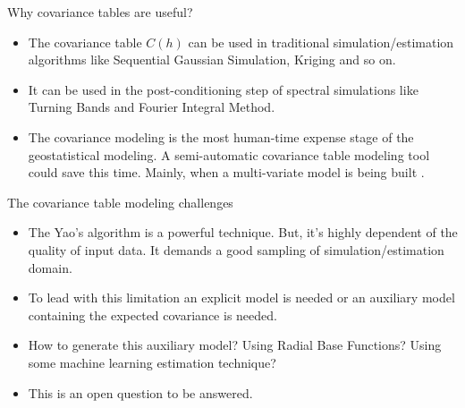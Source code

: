 \begin{frame}{Why covariance tables are useful?}
\begin{itemize}
\item The covariance table $C(h)$ can be used in traditional simulation/estimation algorithms like Sequential Gaussian Simulation, Kriging and so on.
\item It can be used in the post-conditioning step of spectral simulations like Turning Bands and Fourier Integral Method.
\item The covariance modeling is the most human-time expense stage of the geostatistical modeling. A semi-automatic covariance table modeling tool could save this time. Mainly, when a multi-variate model is being built \cite{cov.paper}.
\end{itemize}
\end{frame}

\begin{frame}{The covariance table modeling challenges}

\begin{itemize}
\item The Yao's algorithm is a powerful technique. But, it's highly dependent of the quality of input data. It demands a good sampling of simulation/estimation domain.

\item To lead with this limitation an explicit model is needed or an auxiliary  model containing the expected covariance is needed.

\item How to generate this auxiliary model? Using Radial Base Functions? Using some machine learning estimation technique?

\item This is an open question to be answered.
\end{itemize}

\end{frame}


